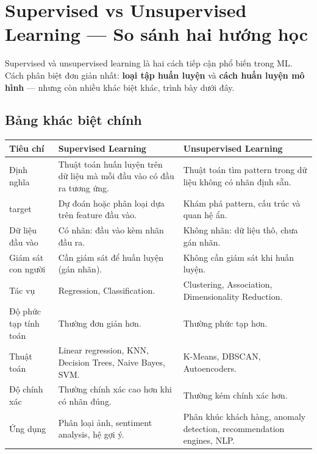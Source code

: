 \section{Supervised vs Unsupervised Learning --- So sánh hai hướng học}
\label{sec:supervised-vs-unsupervised}

\begin{dongco}[title={Hai hướng phổ biến nhất}]
Supervised và unsupervised learning là hai cách tiếp cận phổ biến trong ML.
Cách phân biệt đơn giản nhất: \textbf{loại tập huấn luyện} và \textbf{cách huấn luyện mô hình} --- nhưng còn nhiều khác biệt khác, trình bày dưới đây.
\end{dongco}

\begin{vidu}[title={Minh hoạ so sánh}]
\end{vidu}

\subsection{Bảng khác biệt chính}

\begin{vidu}[title={Supervised vs Unsupervised}]
\begin{tabularx}{\linewidth}{>{\raggedright\arraybackslash}p{2.8cm}XX}
\textbf{Tiêu chí} & \textbf{Supervised Learning} & \textbf{Unsupervised Learning} \\
\midrule
Định nghĩa &
Thuật toán huấn luyện trên dữ liệu mà mỗi đầu vào có đầu ra tương ứng. &
Thuật toán tìm pattern trong dữ liệu không có nhãn định sẵn. \\
target &
Dự đoán hoặc phân loại dựa trên feature đầu vào. &
Khám phá pattern, cấu trúc và quan hệ ẩn. \\
Dữ liệu đầu vào &
Có nhãn: đầu vào kèm nhãn đầu ra. &
Không nhãn: dữ liệu thô, chưa gán nhãn. \\
Giám sát con người &
Cần giám sát để huấn luyện (gán nhãn). &
Không cần giám sát khi huấn luyện. \\
Tác vụ &
Regression, Classification. &
Clustering, Association, Dimensionality Reduction. \\
Độ phức tạp tính toán &
Thường đơn giản hơn. &
Thường phức tạp hơn. \\
Thuật toán &
Linear regression, KNN, Decision Trees, Naive Bayes, SVM. &
K-Means, DBSCAN, Autoencoders. \\
Độ chính xác &
Thường chính xác cao hơn khi có nhãn đúng. &
Thường kém chính xác hơn. \\
Ứng dụng &
Phân loại ảnh, sentiment analysis, hệ gợi ý. &
Phân khúc khách hàng, anomaly detection, recommendation engines, NLP. \\
\end{tabularx}
\end{vidu}

